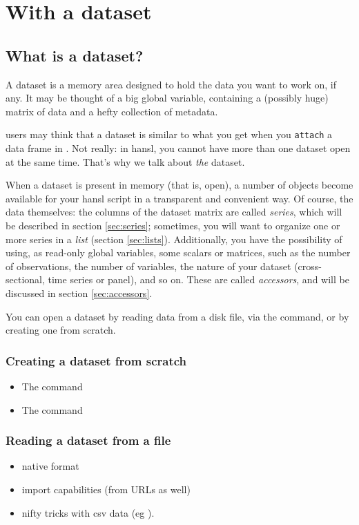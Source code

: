 \part{With a dataset}
\label{part:hp-data}

\chapter{What is a dataset?}

A dataset is a memory area designed to hold the data you want to work
on, if any. It may be thought of a big global variable, containing a
(possibly huge) matrix of data and a hefty collection of metadata.

 users may think that a dataset is similar to what you get when
you \texttt{attach} a data frame in . Not really: in hansl, you
cannot have more than one dataset open at the same time. That's why we
talk about \emph{the} dataset.

When a dataset is present in memory (that is, open), a number of
objects become available for your hansl script in a transparent and
convenient way. Of course, the data themselves: the columns of the
dataset matrix are called \emph{series}, which will be described in
section \ref{sec:series}; sometimes, you will want to organize one or
more series in a \emph{list} (section \ref{sec:lists}). Additionally,
you have the possibility of using, as read-only global variables, some
scalars or matrices, such as the number of observations, the number of
variables, the nature of your dataset (cross-sectional, time series or
panel), and so on. These are called \emph{accessors}, and will be
discussed in section \ref{sec:accessors}.

You can open a dataset by reading data from a disk file, via the
 command, or by creating one from scratch.

\section{Creating a dataset from scratch}
\begin{itemize}
\item The  command
\item The  command
\end{itemize}

\section{Reading a dataset from a file}
\begin{itemize}
\item native format
\item import capabilities (from URLs as well)
\item nifty tricks with csv data (eg ).
\end{itemize}

